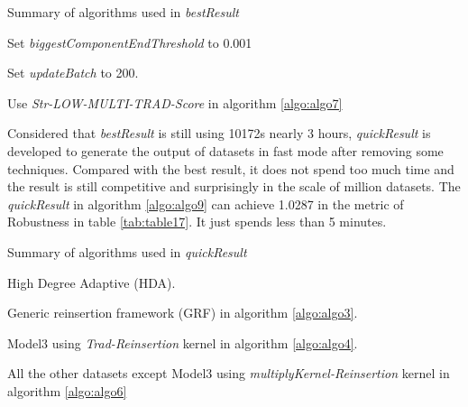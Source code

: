 \documentclass{article}
\begin{document}
	\begin{algorithm}[!htbp]
		\caption{ Summary of algorithms used in \textit{bestResult} }
		\label{algo:algo8}
		\begin{algorithmic}[1]
			\State Set \textit{biggestComponentEndThreshold} to 0.001
			
			\State Set \textit{updateBatch} to 200.
			
			\State Use \textit{Str-LOW-MULTI-TRAD-Score} in algorithm \ref{algo:algo7}
						
			
		\end{algorithmic}
	\end{algorithm}


	Considered that \textit{bestResult} is still using 10172s nearly 3 hours, \textit{quickResult} is developed to generate the output of datasets in fast mode after removing some techniques. Compared with the best result, it does not spend too much time and the result is still competitive and surprisingly in the scale of million datasets. The \textit{quickResult} in algorithm \ref{algo:algo9} can achieve 1.0287 in the metric of Robustness in table \ref{tab:table17}. It just spends less than 5 minutes.
	
	
	\begin{algorithm}[!htbp]
		\caption{ Summary of algorithms used in \textit{quickResult} }
		\label{algo:algo9}
		\begin{algorithmic}[1]
			
			\State High Degree Adaptive (HDA).

			\State Generic reinsertion framework (GRF) in algorithm \ref{algo:algo3}.
			
			\State Model3 using \textit{Trad-Reinsertion} kernel in algorithm \ref{algo:algo4}.
			
			\State All the other datasets except Model3 using \textit{multiplyKernel-Reinsertion} kernel in algorithm \ref{algo:algo6}
			
		\end{algorithmic}
	\end{algorithm}
	
	
	
\end{document}
